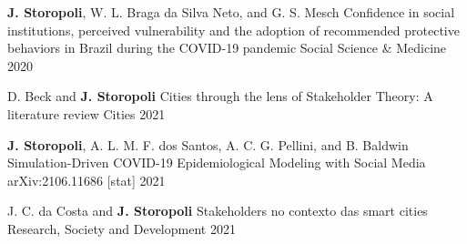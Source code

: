 

\begin{cventries}

  \cventry
    {\textbf{J. Storopoli}, W. L. Braga da Silva Neto, and G. S. Mesch} %
    {Confidence in social institutions, perceived vulnerability and the adoption of recommended protective behaviors in Brazil during the COVID-19 pandemic} %
    {Social Science & Medicine} %
    {2020} %
    {}

  \cventry
    {D. Beck and \textbf{J. Storopoli}} %
    {Cities through the lens of Stakeholder Theory: A literature review} %
    {Cities} %
    {2021} %
    {}

  \cventry
    {\textbf{J. Storopoli}, A. L. M. F. dos Santos, A. C. G. Pellini, and B. Baldwin} %
    {Simulation-Driven COVID-19 Epidemiological Modeling with Social Media} %
    {arXiv:2106.11686 [stat]} %
    {2021} %
    {}

  \cventry
    {J. C. da Costa and \textbf{J. Storopoli}} %
    {Stakeholders no contexto das smart cities} %
    {Research, Society and Development} %
    {2021} %
    {}

\end{cventries}
